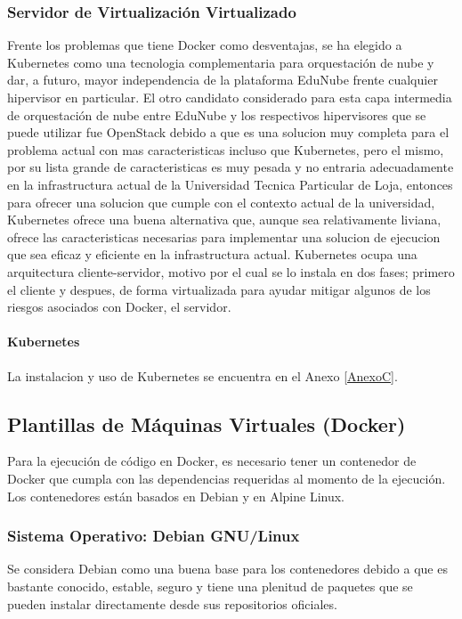 \subsubsection{Servidor de Virtualización Virtualizado}
Frente los problemas que tiene Docker como desventajas, se ha elegido a Kubernetes como una tecnologia complementaria para orquestación de nube y dar, a futuro, mayor independencia de la plataforma EduNube frente cualquier hipervisor en particular. El otro candidato considerado para esta capa intermedia de orquestación de nube entre EduNube y los respectivos hipervisores que se puede utilizar fue OpenStack debido a que es una solucion muy completa para el problema actual con mas caracteristicas incluso que Kubernetes, pero el mismo, por su lista grande de caracteristicas es muy pesada y no entraria adecuadamente en la infrastructura actual de la Universidad Tecnica Particular de Loja, entonces para ofrecer una solucion que cumple con el contexto actual de la universidad, Kubernetes ofrece una buena alternativa que, aunque sea relativamente liviana, ofrece las caracteristicas necesarias para implementar una solucion de ejecucion que sea eficaz y eficiente en la infrastructura actual. Kubernetes ocupa una arquitectura cliente-servidor, motivo por el cual se lo instala en dos fases; primero el cliente y despues, de forma virtualizada para ayudar mitigar algunos de los riesgos asociados con Docker, el servidor. 

\paragraph{Kubernetes}
La instalacion y uso de Kubernetes se encuentra en el Anexo \ref{AnexoC}.

\subsection{Plantillas de Máquinas Virtuales (Docker)}
Para la ejecución de código en Docker, es necesario tener un contenedor de Docker que cumpla con las dependencias requeridas al momento de la ejecución. Los contenedores están basados en Debian y en Alpine Linux.

\subsubsection{Sistema Operativo: Debian GNU/Linux}
Se considera Debian como una buena base para los contenedores debido a que es bastante conocido, estable, seguro y tiene una plenitud de paquetes que se pueden instalar directamente desde sus repositorios oficiales.

